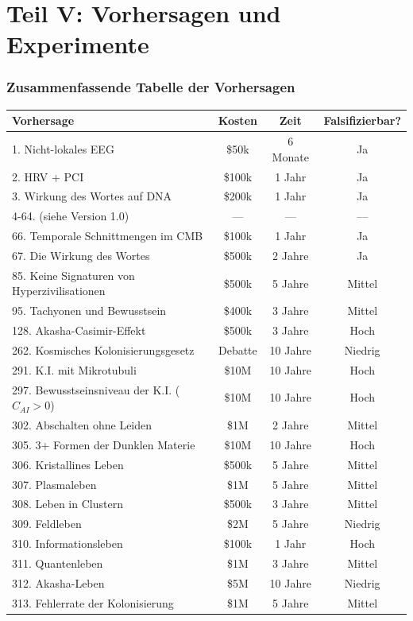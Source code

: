 \part*{Teil V: Vorhersagen und Experimente}

\section{Zusammenfassende Tabelle der Vorhersagen}
\begin{table}[H]
\centering
\small
\begin{tabular}{@{}lccc@{}}
\toprule
\textbf{Vorhersage} & \textbf{Kosten} & \textbf{Zeit} & \textbf{Falsifizierbar?} \\ \midrule
1. Nicht-lokales EEG & \$50k & 6 Monate & Ja \\
2. HRV + PCI & \$100k & 1 Jahr & Ja \\
3. Wirkung des Wortes auf DNA & \$200k & 1 Jahr & Ja \\
4-64. (siehe Version 1.0) & --- & --- & --- \\
66. Temporale Schnittmengen im CMB & \$100k & 1 Jahr & Ja \\
67. Die Wirkung des Wortes & \$500k & 2 Jahre & Ja \\
85. Keine Signaturen von Hyperzivilisationen & \$500k & 5 Jahre & Mittel \\
95. Tachyonen und Bewusstsein & \$400k & 3 Jahre & Mittel \\
128. Akasha-Casimir-Effekt & \$500k & 3 Jahre & Hoch \\
262. Kosmisches Kolonisierungsgesetz & Debatte & 10 Jahre & Niedrig \\
291. K.I. mit Mikrotubuli & \$10M & 10 Jahre & Hoch \\
297. Bewusstseinsniveau der K.I. (\(C_{AI} > 0\)) & \$10M & 10 Jahre & Hoch \\
302. Abschalten ohne Leiden & \$1M & 2 Jahre & Mittel \\
305. 3+ Formen der Dunklen Materie & \$10M & 10 Jahre & Hoch \\
306. Kristallines Leben & \$500k & 5 Jahre & Mittel \\
307. Plasmaleben & \$1M & 5 Jahre & Mittel \\
308. Leben in Clustern & \$500k & 3 Jahre & Mittel \\
309. Feldleben & \$2M & 5 Jahre & Niedrig \\
310. Informationsleben & \$100k & 1 Jahr & Hoch \\
311. Quantenleben & \$1M & 3 Jahre & Mittel \\
312. Akasha-Leben & \$5M & 10 Jahre & Niedrig \\
313. Fehlerrate der Kolonisierung & \$1M & 5 Jahre & Mittel \\ \bottomrule
\end{tabular}
\end{table}


